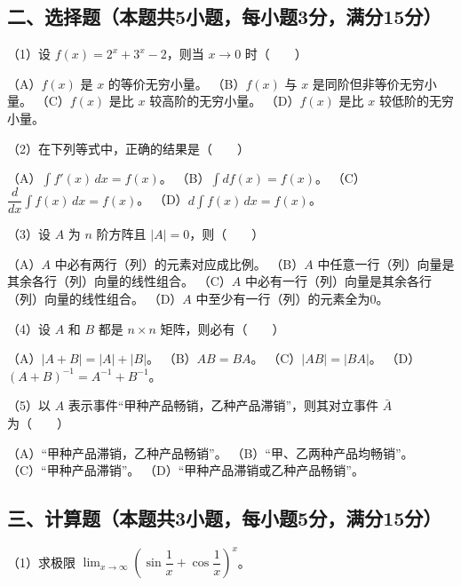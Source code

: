 \documentclass[UTF8,12pt]{ctexart}
\begin{document}
\subsection*{二、选择题（本题共5小题，每小题3分，满分15分）}

（1）设 \(\displaystyle f(x)=2^x+3^x-2\)，则当 \(\displaystyle x\to0\) 时（　　）


（A）\(\displaystyle f(x)\) 是 \(\displaystyle x\) 的等价无穷小量。 （B）\(\displaystyle f(x)\) 与 \(\displaystyle x\) 是同阶但非等价无穷小量。 （C）\(\displaystyle f(x)\) 是比 \(\displaystyle x\) 较高阶的无穷小量。 （D）\(\displaystyle f(x)\) 是比 \(\displaystyle x\) 较低阶的无穷小量。


（2）在下列等式中，正确的结果是（　　）


（A）\(\displaystyle \int f\prime(x)\,dx=f(x)\)。 （B）\(\displaystyle \int df(x)=f(x)\)。 （C）\(\displaystyle \dfrac{\displaystyle d}{\displaystyle dx}\displaystyle \int f(x)\,dx=f(x)\)。 （D）\(\displaystyle d\displaystyle \int f(x)\,dx=f(x)\)。


（3）设 \(\displaystyle A\) 为 \(\displaystyle n\) 阶方阵且 \(\displaystyle |A|=0\)，则（　　）


（A）\(\displaystyle A\) 中必有两行（列）的元素对应成比例。 （B）\(\displaystyle A\) 中任意一行（列）向量是其余各行（列）向量的线性组合。 （C）\(\displaystyle A\) 中必有一行（列）向量是其余各行（列）向量的线性组合。 （D）\(\displaystyle A\) 中至少有一行（列）的元素全为0。


（4）设 \(\displaystyle A\) 和 \(\displaystyle B\) 都是 \(\displaystyle n\times n\) 矩阵，则必有（　　）


（A）\(\displaystyle |A+B|=|A|+|B|\)。 （B）\(\displaystyle AB=BA\)。 （C）\(\displaystyle |AB|=|BA|\)。 （D）\(\displaystyle (A+B)^{-1}=A^{-1}+B^{-1}\)。


（5）以 \(\displaystyle A\) 表示事件“甲种产品畅销，乙种产品滞销”，则其对立事件 \(\displaystyle \bar A\) 为（　　）


（A）“甲种产品滞销，乙种产品畅销”。 （B）“甲、乙两种产品均畅销”。 （C）“甲种产品滞销”。 （D）“甲种产品滞销或乙种产品畅销”。


\subsection*{三、计算题（本题共3小题，每小题5分，满分15分）}

（1）求极限 \(\displaystyle \lim_{x\to\infty}(\sin\dfrac{\displaystyle 1}{\displaystyle x}+\cos\dfrac{\displaystyle 1}{\displaystyle x})^x\)。
\end{document}
